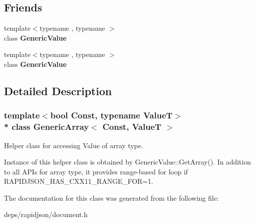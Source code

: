 \subsection*{Friends}
\begin{DoxyCompactItemize}
\item 
{\footnotesize template$<$typename , typename $>$ }\\class {\bfseries Generic\+Value}\hypertarget{class_generic_array_a899449e1a645b5e377af059fb61113d8}{}\label{class_generic_array_a899449e1a645b5e377af059fb61113d8}

\item 
{\footnotesize template$<$typename , typename $>$ }\\class {\bfseries Generic\+Value}\hypertarget{class_generic_array_ae85bda3be5ddb0ad7b3dc29984467ac2}{}\label{class_generic_array_ae85bda3be5ddb0ad7b3dc29984467ac2}

\end{DoxyCompactItemize}


\subsection{Detailed Description}
\subsubsection*{template$<$bool Const, typename ValueT$>$\\*
class Generic\+Array$<$ Const, Value\+T $>$}

Helper class for accessing Value of array type. 

Instance of this helper class is obtained by {\ttfamily Generic\+Value\+::\+Get\+Array()}. In addition to all A\+P\+Is for array type, it provides range-\/based for loop if {\ttfamily R\+A\+P\+I\+D\+J\+S\+O\+N\+\_\+\+H\+A\+S\+\_\+\+C\+X\+X11\+\_\+\+R\+A\+N\+G\+E\+\_\+\+F\+OR=1}. 

The documentation for this class was generated from the following file\+:\begin{DoxyCompactItemize}
\item 
deps/rapidjson/document.\+h\end{DoxyCompactItemize}
